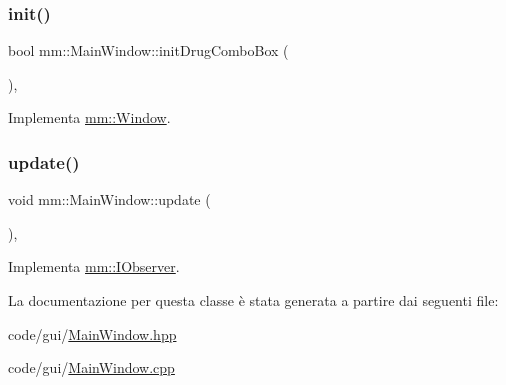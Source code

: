 \subsubsection{\texorpdfstring{init()}{init()}}
{\footnotesize\ttfamily bool mm\+::\+Main\+Window\+::initDrugComboBox (\begin{DoxyParamCaption}{ }\end{DoxyParamCaption})\hspace{0.3cm}{\ttfamily [override]}, {\ttfamily [virtual]}}



Implementa \hyperlink{classmm_1_1_window_aba03fbf4761b2f106352baecf5996e10}{mm\+::\+Window}.

\mbox{\label{classmm_1_1_main_window_ac0fc4875dc774c1b7b1ca59d174a7fc1}} 
\subsubsection{\texorpdfstring{update()}{update()}}
{\footnotesize\ttfamily void mm\+::\+Main\+Window\+::update (\begin{DoxyParamCaption}{ }\end{DoxyParamCaption})\hspace{0.3cm}{\ttfamily [override]}, {\ttfamily [virtual]}}



Implementa \hyperlink{classmm_1_1_i_observer_a6422af04f8e9f3ba9d6d412a3bcdd03e}{mm\+::\+I\+Observer}.



La documentazione per questa classe è stata generata a partire dai seguenti file\+:\begin{DoxyCompactItemize}
\item 
code/gui/\hyperlink{_main_window_8hpp}{Main\+Window.\+hpp}\item 
code/gui/\hyperlink{_main_window_8cpp}{Main\+Window.\+cpp}\end{DoxyCompactItemize}
